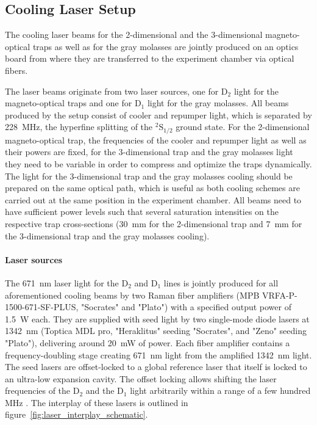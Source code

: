 \subsection*{Cooling Laser Setup}
The cooling laser beams for the 2-dimensional and the 3-dimensional magneto-optical traps as well as for the gray molasses are jointly produced on an optics board from where they are transferred to the experiment chamber via optical fibers.

The laser beams originate from two laser sources, one for D$_2$ light for the magneto-optical traps and one for D$_1$ light for the gray molasses. All beams produced by the setup consist of cooler and repumper light, which is separated by \SI{228}{\mega\hertz}, the hyperfine splitting of the $^2\text{S}_{1/2}$ ground state. For the 2-dimensional magneto-optical trap, the frequencies of the cooler and repumper light as well as their powers are fixed, for the 3-dimensional trap and the gray molasses light they need to be variable in order to compress and optimize the traps dynamically. The light for the 3-dimensional trap and the gray molasses cooling should be prepared on the same optical path, which is useful as both cooling schemes are carried out at the same position in the experiment chamber. All beams need to have sufficient power levels such that several saturation intensities on the respective trap cross-sections (\SI{30}{\milli\meter} for the 2-dimensional trap and \SI{7}{\milli\meter} for the 3-dimensional trap and the gray molasses cooling).

\paragraph{Laser sources}
The \SI{671}{\nano\meter} laser light for the D$_2$ and D$_1$ lines is jointly produced for all aforementioned cooling beams by two Raman fiber amplifiers (MPB VRFA-P-1500-671-SF-PLUS, "Socrates" and "Plato") with a specified output power of \SI{1.5}{\watt} each. They are supplied with seed light by two single-mode diode lasers at \SI{1342}{\nano\meter} (Toptica MDL pro, "Heraklitus" seeding "Socrates", and "Zeno" seeding "Plato"), delivering around \SI{20}{\milli\watt} of power. Each fiber amplifier contains a frequency-doubling stage creating \SI{671}{\nano\meter} light from the amplified \SI{1342}{\nano\meter} light. The seed lasers are offset-locked to a global reference laser that itself is locked to an ultra-low expansion cavity. The offset locking allows shifting the laser frequencies of the D$_2$ and the D$_1$ light arbitrarily within a range of a few hundred \si{\mega\hertz} . The interplay of these lasers is outlined in figure~\ref{fig:laser_interplay_schematic}.

